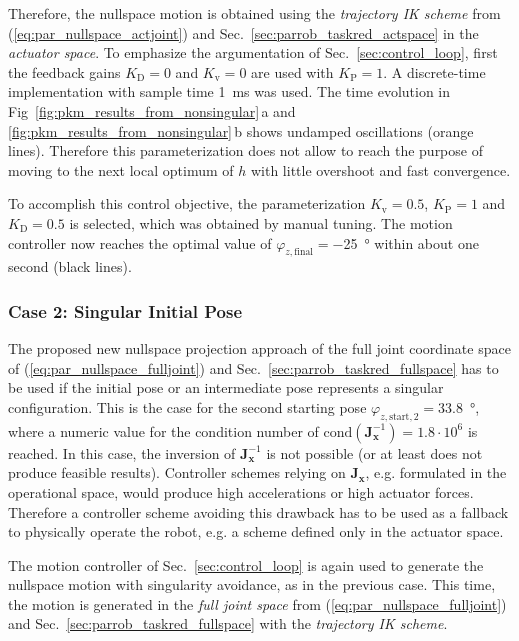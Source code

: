 \documentclass[a4paper,twoside]{article}
\begin{document}
Therefore, the nullspace motion is obtained using the \emph{trajectory IK scheme} from (\ref{eq:par_nullspace_actjoint}) and Sec.~\ref{sec:parrob_taskred_actspace} in the \emph{actuator space}. %
To emphasize the argumentation of Sec.~\ref{sec:control_loop}, first the feedback gains $K_\mathrm{D}=0$ and $K_\mathrm{v}=0$ are used with $K_\mathrm{P}=1$.
A discrete-time implementation with sample time \SI{1}{\milli\second} was used.
The time evolution in Fig~\ref{fig:pkm_results_from_nonsingular}\,a and \ref{fig:pkm_results_from_nonsingular}\,b shows undamped oscillations (orange lines).
Therefore this parameterization does not allow to reach the purpose of moving to the next local optimum of $h$ with little overshoot and fast convergence.

To accomplish this control objective, the parameterization $K_\mathrm{v}{=}0.5$, $K_\mathrm{P}{=}1$ and $K_\mathrm{D}{=}0.5$ is selected, which was obtained by manual tuning.
The motion controller now reaches the optimal value of $\varphi_{z,\mathrm{final}}{=}$\SI{-25}{\degree} within about one second (black lines).


\subsubsection{Case 2: Singular Initial Pose}
\label{sec:eval_case2}



The proposed new nullspace projection approach of the full joint coordinate space of (\ref{eq:par_nullspace_fulljoint}) and Sec.~\ref{sec:parrob_taskred_fullspace} has to be used if the initial pose or an intermediate pose represents a singular configuration.
This is the case for the second starting pose $\varphi_{z,\mathrm{start},2}{=}$\SI{33.8}{\degree}, where a numeric value for the condition number of $\mathrm{cond}(\bm{J}_{\bm{x}}^{-1})=1.8 \cdot 10^6$ is reached.
In this case, the inversion of $\bm{J}_{\bm{x}}^{-1}$ is not possible (or at least does not produce feasible results).
Controller schemes relying on $\bm{J}_{\bm{x}}$, e.g. formulated in the operational space, would produce high accelerations or high actuator forces.
Therefore a controller scheme avoiding this drawback has to be used as a fallback to physically operate the robot, e.g. a scheme defined only in the actuator space.

The motion controller of Sec.~\ref{sec:control_loop} is again used to generate the nullspace motion with singularity avoidance, as in the previous case.
This time, the motion is generated in the \emph{full joint space} from (\ref{eq:par_nullspace_fulljoint}) and Sec.~\ref{sec:parrob_taskred_fullspace} with the \emph{trajectory IK scheme}.
\end{document}
